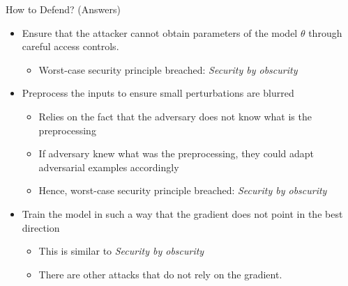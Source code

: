 \documentclass[10pt]{beamer}
\begin{document}
\begin{frame}{How to Defend? (Answers)}
  \begin{itemize}[<+->]
    \item Ensure that the attacker cannot obtain parameters of the model $\theta$ through careful
      access controls.
      \begin{itemize}
        \item Worst-case security principle breached: \emph{Security by obscurity}
      \end{itemize}

    \item Preprocess the inputs to ensure small perturbations are blurred
      \begin{itemize}
        \item Relies on the fact that the adversary does not know what is the preprocessing
        \item If adversary knew what was the preprocessing, they could adapt adversarial examples
          accordingly
        \item Hence, worst-case security principle breached: \emph{Security by obscurity}
      \end{itemize}

    \item Train the model in such a way that the gradient does not point in the best direction
      \begin{itemize}
        \item This is similar to \emph{Security by obscurity}
        \item There are other attacks that do not rely on the gradient.
      \end{itemize}
  \end{itemize}

\end{frame}
\end{document}
